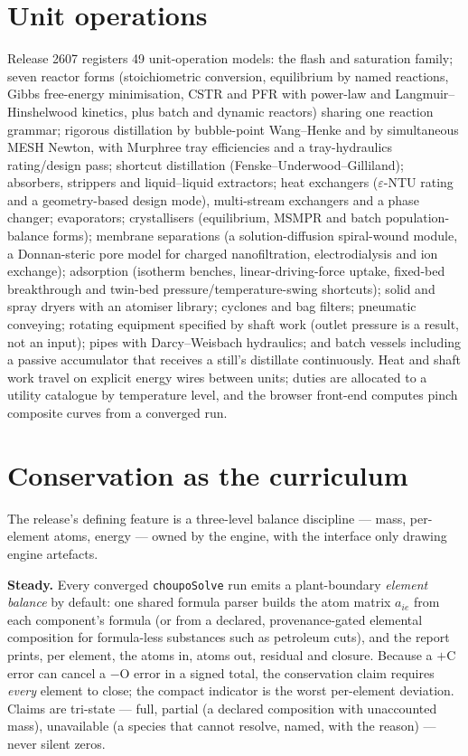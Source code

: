 \documentclass[11pt,a4paper]{article}
\newcommand{\code}[1]{\texttt{#1}}
\begin{document}
\section{Unit operations}

Release 2607 registers 49 unit-operation models: the flash and
saturation family; seven reactor forms (stoichiometric conversion,
equilibrium by named reactions, Gibbs free-energy minimisation, CSTR and
PFR with power-law and Langmuir--Hinshelwood kinetics, plus batch and
dynamic reactors) sharing one reaction grammar; rigorous distillation by
bubble-point Wang--Henke \citep{wang1966} and by simultaneous MESH
Newton, with Murphree tray efficiencies and a tray-hydraulics
rating/design pass; shortcut distillation (Fenske--Underwood--Gilliland);
absorbers, strippers and liquid--liquid extractors; heat exchangers
($\varepsilon$-NTU rating and a geometry-based design mode), multi-stream
exchangers and a phase changer; evaporators; crystallisers (equilibrium,
MSMPR and batch population-balance forms); membrane separations (a
solution-diffusion spiral-wound module, a Donnan-steric pore model for
charged nanofiltration, electrodialysis and ion exchange); adsorption
(isotherm benches, linear-driving-force uptake, fixed-bed breakthrough
and twin-bed pressure/temperature-swing shortcuts); solid and spray
dryers with an atomiser library; cyclones and bag filters; pneumatic
conveying; rotating equipment specified by shaft work (outlet pressure is
a result, not an input); pipes with Darcy--Weisbach hydraulics; and batch
vessels including a passive accumulator that receives a still's
distillate continuously.  Heat and shaft work travel on explicit energy
wires between units; duties are allocated to a utility catalogue by
temperature level, and the browser front-end computes pinch composite
curves from a converged run.

\section{Conservation as the curriculum}

The release's defining feature is a three-level balance discipline ---
mass, per-element atoms, energy --- owned by the engine, with the
interface only drawing engine artefacts.

\textbf{Steady.}  Every converged \code{choupoSolve} run emits a
plant-boundary \emph{element balance} by default: one shared formula
parser builds the atom matrix $a_{ie}$ from each component's formula (or
from a declared, provenance-gated elemental composition for
formula-less substances such as petroleum cuts), and the report prints,
per element, the atoms in, atoms out, residual and closure.  Because a
$+$C error can cancel a $-$O error in a signed total, the conservation
claim requires \emph{every} element to close; the compact indicator is
the worst per-element deviation.  Claims are tri-state --- full, partial
(a declared composition with unaccounted mass), unavailable (a species
that cannot resolve, named, with the reason) --- never silent zeros.
\end{document}
